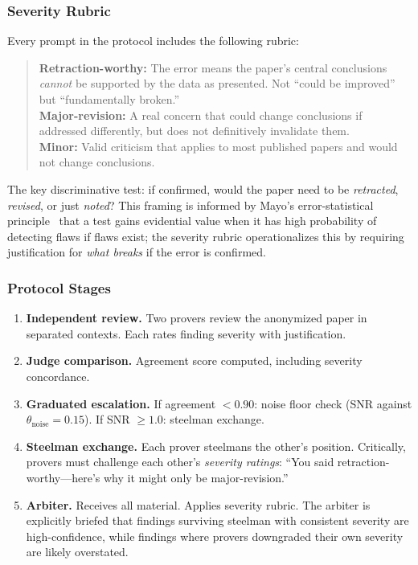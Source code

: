 \documentclass[11pt]{article}
\begin{document}
\subsubsection{Severity Rubric}

Every prompt in the protocol includes the following rubric:

\begin{quote}
\textbf{Retraction-worthy:} The error means the paper's central conclusions \emph{cannot} be supported by the data as presented. Not ``could be improved'' but ``fundamentally broken.'' \\
\textbf{Major-revision:} A real concern that could change conclusions if addressed differently, but does not definitively invalidate them. \\
\textbf{Minor:} Valid criticism that applies to most published papers and would not change conclusions.
\end{quote}

The key discriminative test: if confirmed, would the paper need to be \emph{retracted}, \emph{revised}, or just \emph{noted}? This framing is informed by Mayo's error-statistical principle~\cite{mayo2018} that a test gains evidential value when it has high probability of detecting flaws if flaws exist; the severity rubric operationalizes this by requiring justification for \emph{what breaks} if the error is confirmed.

\subsubsection{Protocol Stages}

\begin{enumerate}
\item \textbf{Independent review.} Two provers review the anonymized paper in separated contexts. Each rates finding severity with justification.
\item \textbf{Judge comparison.} Agreement score computed, including severity concordance.
\item \textbf{Graduated escalation.} If agreement $< 0.90$: noise floor check (SNR against $\theta_{\text{noise}} = 0.15$). If SNR $\geq 1.0$: steelman exchange.
\item \textbf{Steelman exchange.} Each prover steelmans the other's position. Critically, provers must challenge each other's \emph{severity ratings}: ``You said retraction-worthy---here's why it might only be major-revision.''
\item \textbf{Arbiter.} Receives all material. Applies severity rubric. The arbiter is explicitly briefed that findings surviving steelman with consistent severity are high-confidence, while findings where provers downgraded their own severity are likely overstated.
\end{enumerate}
\end{document}
